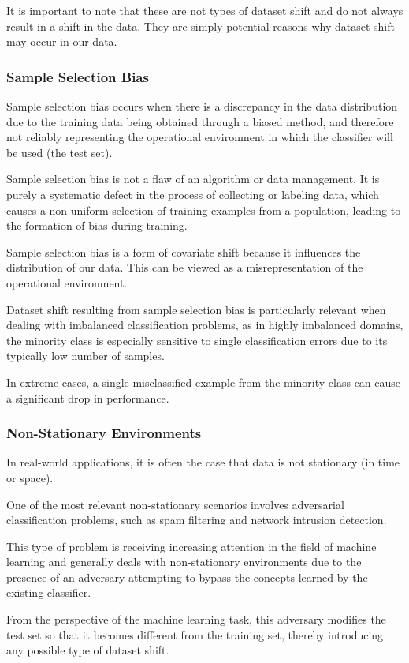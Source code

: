 It is important to note that these are not types of dataset shift and do not always result in a shift in the data. They are simply potential reasons why dataset shift may occur in our data.

\subsubsection{Sample Selection Bias}
Sample selection bias occurs when there is a discrepancy in the data distribution due to the training data being obtained through a biased method, and therefore not reliably representing the operational environment in which the classifier will be used (the test set).

Sample selection bias is not a flaw of an algorithm or data management. It is purely a systematic defect in the process of collecting or labeling data, which causes a non-uniform selection of training examples from a population, leading to the formation of bias during training.

Sample selection bias is a form of covariate shift because it influences the distribution of our data. This can be viewed as a misrepresentation of the operational environment.

Dataset shift resulting from sample selection bias is particularly relevant when dealing with imbalanced classification problems, as in highly imbalanced domains, the minority class is especially sensitive to single classification errors due to its typically low number of samples.

In extreme cases, a single misclassified example from the minority class can cause a significant drop in performance.

\subsubsection{Non-Stationary Environments}
In real-world applications, it is often the case that data is not stationary (in time or space).

One of the most relevant non-stationary scenarios involves adversarial classification problems, such as spam filtering and network intrusion detection.

This type of problem is receiving increasing attention in the field of machine learning and generally deals with non-stationary environments due to the presence of an adversary attempting to bypass the concepts learned by the existing classifier.

From the perspective of the machine learning task, this adversary modifies the test set so that it becomes different from the training set, thereby introducing any possible type of dataset shift.


